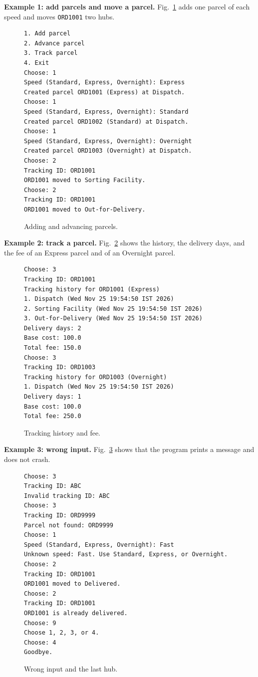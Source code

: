 \textbf{Example 1: add parcels and move a parcel.}
Fig.~\ref{fig:run1} adds one parcel of each speed and moves \texttt{ORD1001} two hubs.

\begin{figure}[h]
\begin{lstlisting}[style=console]
1. Add parcel
2. Advance parcel
3. Track parcel
4. Exit
Choose: 1
Speed (Standard, Express, Overnight): Express
Created parcel ORD1001 (Express) at Dispatch.
Choose: 1
Speed (Standard, Express, Overnight): Standard
Created parcel ORD1002 (Standard) at Dispatch.
Choose: 1
Speed (Standard, Express, Overnight): Overnight
Created parcel ORD1003 (Overnight) at Dispatch.
Choose: 2
Tracking ID: ORD1001
ORD1001 moved to Sorting Facility.
Choose: 2
Tracking ID: ORD1001
ORD1001 moved to Out-for-Delivery.
\end{lstlisting}
\caption{Adding and advancing parcels.}
\label{fig:run1}
\end{figure}

\textbf{Example 2: track a parcel.}
Fig.~\ref{fig:run2} shows the history, the delivery days, and the fee of an
Express parcel and of an Overnight parcel.

\begin{figure}[h]
\begin{lstlisting}[style=console]
Choose: 3
Tracking ID: ORD1001
Tracking history for ORD1001 (Express)
1. Dispatch (Wed Nov 25 19:54:50 IST 2026)
2. Sorting Facility (Wed Nov 25 19:54:50 IST 2026)
3. Out-for-Delivery (Wed Nov 25 19:54:50 IST 2026)
Delivery days: 2
Base cost: 100.0
Total fee: 150.0
Choose: 3
Tracking ID: ORD1003
Tracking history for ORD1003 (Overnight)
1. Dispatch (Wed Nov 25 19:54:50 IST 2026)
Delivery days: 1
Base cost: 100.0
Total fee: 250.0
\end{lstlisting}
\caption{Tracking history and fee.}
\label{fig:run2}
\end{figure}

\textbf{Example 3: wrong input.}
Fig.~\ref{fig:run3} shows that the program prints a message and does not
crash.

\begin{figure}[h]
\begin{lstlisting}[style=console]
Choose: 3
Tracking ID: ABC
Invalid tracking ID: ABC
Choose: 3
Tracking ID: ORD9999
Parcel not found: ORD9999
Choose: 1
Speed (Standard, Express, Overnight): Fast
Unknown speed: Fast. Use Standard, Express, or Overnight.
Choose: 2
Tracking ID: ORD1001
ORD1001 moved to Delivered.
Choose: 2
Tracking ID: ORD1001
ORD1001 is already delivered.
Choose: 9
Choose 1, 2, 3, or 4.
Choose: 4
Goodbye.
\end{lstlisting}
\caption{Wrong input and the last hub.}
\label{fig:run3}
\end{figure}


